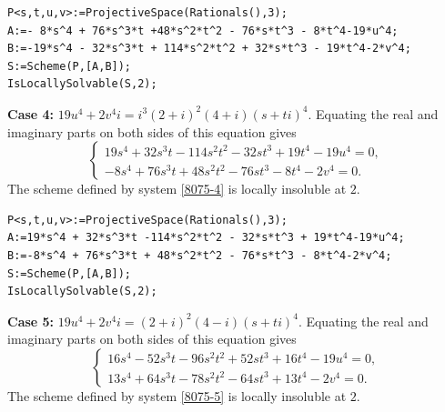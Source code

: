 \documentclass[a4paper,12pt,english,reqno]{amsart}
\begin{document}
\begin{lstlisting}
P<s,t,u,v>:=ProjectiveSpace(Rationals(),3);
A:=- 8*s^4 + 76*s^3*t +48*s^2*t^2 - 76*s*t^3 - 8*t^4-19*u^4;
B:=-19*s^4 - 32*s^3*t + 114*s^2*t^2 + 32*s*t^3 - 19*t^4-2*v^4;
S:=Scheme(P,[A,B]);
IsLocallySolvable(S,2);
\end{lstlisting}


{\bf Case 4:} $19u^4+2v^4i=i^3(2+i)^2(4+i)(s+ti)^4$.  Equating the real and imaginary parts on both sides of this equation gives
\begin{equation}\label{8075-4}
\begin{cases}
19s^4 + 32s^3t - 114s^2t^2 - 32st^3 + 19t^4 - 19u^4=0,\\
-8s^4 + 76s^3t + 48s^2t^2 - 76st^3 - 8t^4 - 2v^4=0.
\end{cases}
\end{equation}
The scheme defined by system \eqref{8075-4} is locally insoluble at $2$.

\begin{lstlisting}
P<s,t,u,v>:=ProjectiveSpace(Rationals(),3);
A:=19*s^4 + 32*s^3*t -114*s^2*t^2 - 32*s*t^3 + 19*t^4-19*u^4;
B:=-8*s^4 + 76*s^3*t + 48*s^2*t^2 - 76*s*t^3 - 8*t^4-2*v^4;
S:=Scheme(P,[A,B]);
IsLocallySolvable(S,2);
\end{lstlisting}


{\bf Case 5:} $19u^4+2v^4i=(2+i)^2(4-i)(s+ti)^4$. Equating the real and imaginary parts on both sides of this equation gives
\begin{equation}\label{8075-5}
\begin{cases}
16s^4 - 52s^3t - 96s^2t^2 + 52st^3 + 16t^4 - 19u^4=0,\\
13s^4 + 64s^3t - 78s^2t^2 - 64st^3 + 13t^4 - 2v^4=0.
\end{cases}
\end{equation}
The scheme defined by system \eqref{8075-5} is locally insoluble at $2$.
\end{document}
